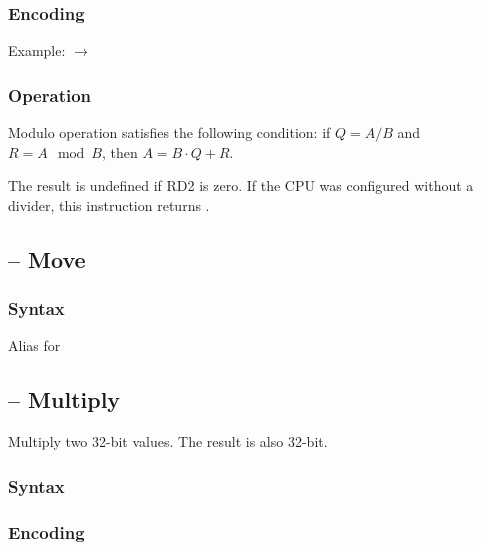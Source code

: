 \documentclass[a4paper,12pt,twoside,extrafontsizes]{memoir}
\begin{document}
{

\subsubsection{Encoding}


Example:  $\rightarrow$ 

\subsubsection{Operation}


Modulo operation satisfies the following condition: if $Q=A/B$ and $R=A \mod B$, then $A=B \cdot Q+R$.

The result is undefined if RD2 is zero. If the CPU was configured without a divider, this instruction returns .

\subsection{ -- Move}
\label{subsec:instr:mov}

\subsubsection{Syntax}


Alias for 

\subsection{ -- Multiply}
\label{subsec:instr:mul}

Multiply two 32-bit values. The result is also 32-bit.

\subsubsection{Syntax}


\subsubsection{Encoding}

}
\end{document}
